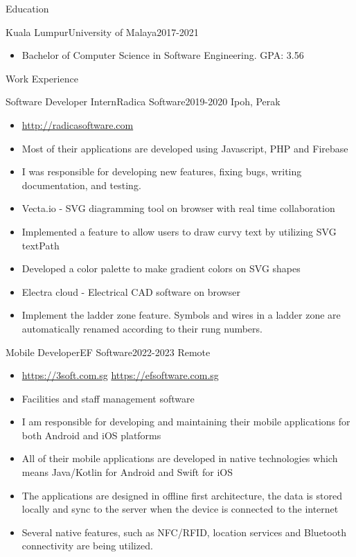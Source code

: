\documentclass[]{mcdowellcv}
\begin{document}
\makeheader


\begin{cvsection}{Education}
	\begin{cvsubsection}{Kuala Lumpur}{University of Malaya}{2017-2021}
		\begin{itemize}
			\item Bachelor of Computer Science in Software Engineering. GPA: 3.56
		\end{itemize}
	\end{cvsubsection}
\end{cvsection}
\begin{cvsection}{Work Experience}
	\begin{cvsubsection}{Software Developer Intern}{Radica Software}{2019-2020}
		Ipoh, Perak
		\begin{itemize}%
			\item \url{http://radicasoftware.com}
			\item Most of their applications are developed using Javascript, PHP and Firebase
			\item I was responsible for developing new features, fixing bugs, writing documentation, and testing.
			\item Vecta.io - SVG diagramming tool on browser with real time collaboration
			\item Implemented a feature to allow users to draw curvy text by utilizing SVG textPath
			\item Developed a color palette to make gradient colors on SVG shapes
			\item Electra cloud - Electrical CAD software on browser
			\item Implement the ladder zone feature. Symbols and wires in a ladder zone are automatically renamed according to their rung numbers.
		\end{itemize}
	\end{cvsubsection}
	\begin{cvsubsection}{Mobile Developer}{EF Software}{2022-2023}
		Remote
		\begin{itemize}%
			\item \url{https://3soft.com.sg} \quad\url{https://efsoftware.com.sg}
			\item Facilities and staff management software
			\item I am responsible for developing and maintaining their mobile applications for both Android and iOS platforms
			\item All of their mobile applications are developed in native technologies which means Java/Kotlin for Android and Swift for iOS
			\item The applications are designed in offline first architecture, the data is stored locally and sync to the server when the device is connected to the internet
			\item Several native features, such as NFC/RFID, location services and Bluetooth connectivity are being utilized.
		\end{itemize}
	\end{cvsubsection}
\end{cvsection}
\end{document}
